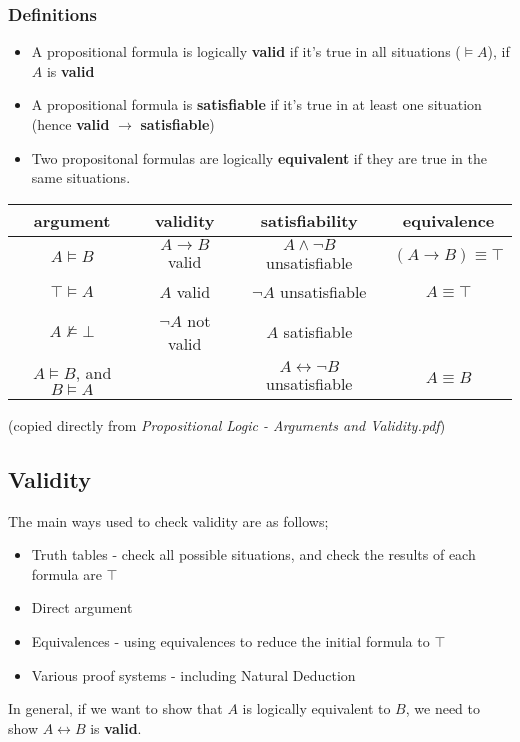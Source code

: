 \documentclass[a4paper, 12pt]{article}
\begin{document}
            \subsubsection*{Definitions}
                \begin{itemize}
                    \itemsep0em
                    \item A propositional formula is logically \textbf{valid} if it's true in all situations ($\vDash A$), if $A$ is \textbf{valid}
                    \item A propositional formula is \textbf{satisfiable} if it's true in at least one situation (hence \textbf{valid} $\rightarrow$ \textbf{satisfiable})
                    \item Two propositonal formulas are logically \textbf{equivalent} if they are true in the same situations.
                \end{itemize}
                \begin{center}
                    \begin{tabular}{|c|c|c|c|}
                        \hline
                        argument & validity & satisfiability & equivalence \\
                        \hline
                        $A \vDash B$ & $A \rightarrow B$ valid & $A \land \neg B$ unsatisfiable & $(A \rightarrow B) \equiv \top$ \\
                        $\top \vDash A$ & $A$ valid & $\neg A$ unsatisfiable & $A \equiv \top$ \\
                        $A \nvDash \bot$ & $\neg A$ not valid & $A$ satisfiable & \\
                        $A \vDash B$, and $B \vDash A$ & & $A \leftrightarrow \neg B$ unsatisfiable & $A \equiv B$ \\
                        \hline
                    \end{tabular}
                    \medskip

                    (copied directly from \textit{Propositional Logic - Arguments and Validity.pdf})
                \end{center}
        \subsection*{Validity}
            The main ways used to check validity are as follows;
            \begin{itemize}
                \itemsep0em
                \item Truth tables - check all possible situations, and check the results of each formula are $\top$
                \item Direct argument
                \item Equivalences - using equivalences to reduce the initial formula to $\top$
                \item Various proof systems - including Natural Deduction
            \end{itemize}
            In general, if we want to show that $A$ is logically equivalent to $B$, we need to show $A \leftrightarrow B$ is \textbf{valid}.
\end{document}

